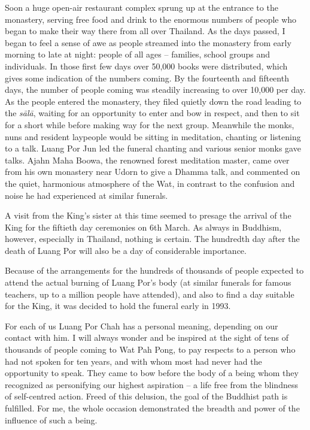 Soon a huge open-air restaurant complex sprung up at the entrance to the
monastery, serving free food and drink to the enormous numbers of people
who began to make their way there from all over Thailand. As the days
passed, I began to feel a sense of awe as people streamed into the
monastery from early morning to late at night: people of all ages --
families, school groups and individuals. In those first few days over
50,000 books were distributed, which gives some indication of the
numbers coming. By the fourteenth and fifteenth days, the number of
people coming was steadily increasing to over 10,000 per day. As the
people entered the monastery, they filed quietly down the road leading
to the \emph{sālā}, waiting for an opportunity to enter and bow in
respect, and then to sit for a short while before making way for the
next group. Meanwhile the monks, nuns and resident laypeople would be
sitting in meditation, chanting or listening to a talk. Luang Por Jun
led the funeral chanting and various senior monks gave talks. Ajahn Maha
Boowa, the renowned forest meditation master, came over from his own
monastery near Udorn to give a Dhamma talk, and commented on the quiet,
harmonious atmosphere of the Wat, in contrast to the confusion and noise
he had experienced at similar funerals.

A visit from the King's sister at this time seemed to presage the
arrival of the King for the fiftieth day ceremonies on 6th March. As
always in Buddhism, however, especially in Thailand, nothing is certain.
The hundredth day after the death of Luang Por will also be a day of
considerable importance.

Because of the arrangements for the hundreds of thousands of people
expected to attend the actual burning of Luang Por's body (at similar
funerals for famous teachers, up to a million people have attended), and
also to find a day suitable for the King, it was decided to hold the
funeral early in 1993.

For each of us Luang Por Chah has a personal meaning, depending on our
contact with him. I will always wonder and be inspired at the sight of
tens of thousands of people coming to Wat Pah Pong, to pay respects to a
person who had not spoken for ten years, and with whom most had never
had the opportunity to speak. They came to bow before the body of a
being whom they recognized as personifying our highest aspiration -- a
life free from the blindness of self-centred action. Freed of this
delusion, the goal of the Buddhist path is fulfilled. For me, the whole
occasion demonstrated the breadth and power of the influence of such a
being.

